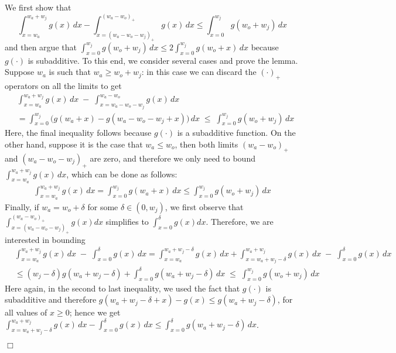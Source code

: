 \documentclass[11pt]{article}
\newenvironment{proofof}[1]{\smallskip\noindent{\bf Proof of #1:}}{\hspace*{\fill}$\Box$\par}
\begin{document}
\begin{proofof}{Lemma~\ref{lem:concave-arrival}}
We first show that
$$\nonumber \int_{x=w_a}^{w_a + w_j} g(x) \,dx - \int_{x = (w_a - w_o - w_j)_{+}}^{(w_a - w_o)_{+}} g(x) \,dx \leq \int_{x=0}^{w_j} g(w_o + w_j) \,dx$$ and then argue that $\int_{x=0}^{w_j} g(w_o + w_j) \,dx \leq 2 \int_{x=0}^{w_j} g(w_o + x) \,dx$ because $g(\cdot)$ is subadditive.
To this end, we consider several cases and prove the lemma.
Suppose $w_a$ is such
that $w_a \geq w_o + w_j$: in this case we can discard the
$(\cdot)_+$ operators on all the limits to get
\begin{align*}
  & \int_{x = w_a}^{w_a + w_j} g(x) \, dx \; - \;
  \int_{x = w_a - w_o  - w_j}^{w_a - w_o} g(x)\,dx
  \\
  &= \int_{x = 0}^{w_j} \bigg( g(w_a + x) - g(w_a - w_o
  - w_j + x) \bigg) \,dx \; \leq \; \int_{x = 0}^{w_j} g(w_o + w_j) \,dx
\end{align*}
Here, the final inequality follows because $g(\cdot)$ is a subadditive function.
On the other hand, suppose it is the case that $w_a \leq w_o$, then both limits $(w_a - w_o)_{+}$ and $(w_a - w_o - w_j)_{+}$ are zero, and therefore we only need to bound $ \int_{x = w_a}^{w_a + w_j} g(x) \, dx$, which can be done as follows:
\begin{gather*}
  \int_{x = w_a}^{w_a + w_j} g(x) \, dx = \int_{x =
    0}^{w_j} g(w_a + x) \, dx \leq \int_{x = 0}^{w_j}
  g(w_o + w_j) \, dx
\end{gather*}
Finally, if $w_a = w_o + \delta$ for some $\delta \in (0, w_j)$,
we first observe that $\int_{x = (w_a - w_o - w_j)_{+}}^{(w_a - w_o)_{+}} g(x) dx$ simplifies to $\int_{x = 0}^{\delta} g(x) dx$. Therefore, we are interested in bounding
\begin{align*}
  & \int_{x = w_a}^{w_a + w_j} g(x) \, dx \; - \; \int_{x =
    0}^{\delta} g(x)\,dx = \int_{x = w_a}^{w_a + w_j - \delta}
  g(x) \, dx + \int_{x = w_a + w_j - \delta}^{w_a + w_j}
  g(x) \, dx \; - \; \int_{x =
    0}^{\delta} g(x)\,dx \\
  &\leq (w_j - \delta) g(w_a + w_j - \delta) + \int_{x =
    0}^{\delta} g(w_a + w_j - \delta) \,dx \; \leq \; \int_{x =
    0}^{w_j} g(w_o + w_j) \,dx
\end{align*}
Here again, in the second to last inequality, we used the fact that $g(\cdot)$ is subadditive and therefore $g(w_a + w_j - \delta + x) - g(x) \leq g(w_a + w_j - \delta)$, for all values of $x \geq 0$; hence we get $\int_{x = w_a + w_j  - \delta}^{w_a + w_j} g(x) \, dx - \int_{x = 0}^{\delta} g(x) \, dx \leq \int_{x = 0}^{\delta} g(w_a + w_j  - \delta) \, dx$.


\end{proofof}
\end{document}
